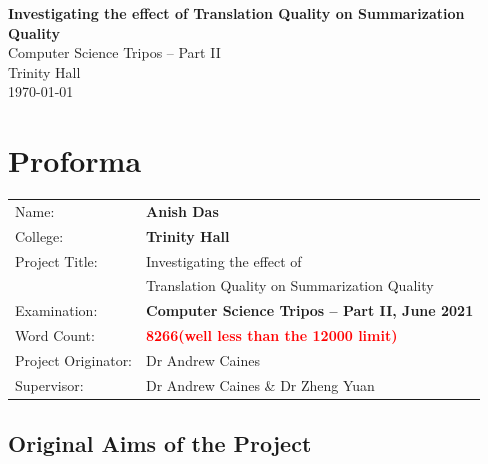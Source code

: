 \documentclass[12pt,a4paper,twoside,openright]{report}
\newcommand{\projectTitle}{Investigating the effect of \\
 & Translation Quality on Summarization Quality}                                        %
\begin{document}
 \renewcommand*{\thefootnote}{\arabic{footnote}}





\pagestyle{empty}


\vspace*{60mm}
\begin{center}
\Huge
\textbf{Investigating the effect of  Translation Quality on Summarization Quality}\\
Computer Science Tripos -- Part II\\[5mm]
Trinity Hall \\[5mm]
\today  %
\end{center}


\pagestyle{plain}

\chapter*{Proforma}

{\large
\begin{tabular}{ll}
Name:               & \bf Anish Das                      \\
College:            & \bf Trinity Hall                     \\
Project Title:      &  \projectTitle \\
Examination:        & \bf Computer Science Tripos -- Part II, June 2021  \\
Word Count:         & \bf \textcolor{red}{8266\footnotemark[1]
                      (well less than the 12000 limit)}  \\
Project Originator: & Dr Andrew Caines                  \\
Supervisor:         & Dr Andrew Caines \& Dr Zheng Yuan                   \\ 
\end{tabular}
}



\section*{Original Aims of the Project}
\end{document}
